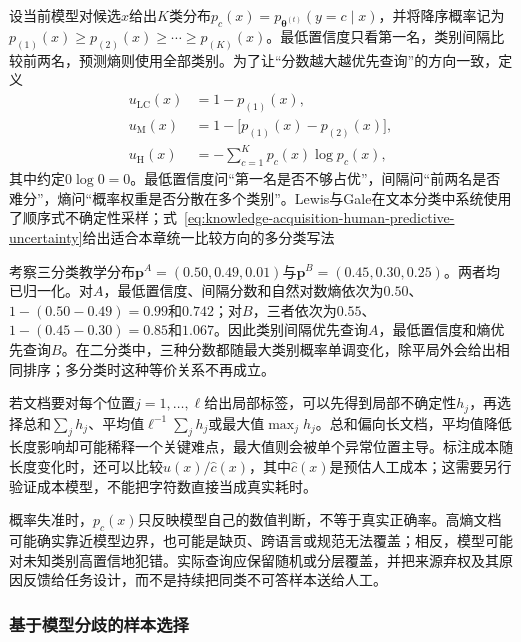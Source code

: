 设当前模型对候选$x$给出$K$类分布$p_c(x)=p_{\bm{\theta}^{(t)}}(y=c\mid x)$，并将降序概率记为$p_{(1)}(x)\geq p_{(2)}(x)\geq\cdots\geq p_{(K)}(x)$。最低置信度只看第一名，类别间隔比较前两名，预测熵则使用全部类别。为了让“分数越大越优先查询”的方向一致，定义
\begin{equation}
  \begin{aligned}
    u_{\mathrm{LC}}(x)
      &=1-p_{(1)}(x),\\
    u_{\mathrm{M}}(x)
      &=1-\bigl[p_{(1)}(x)-p_{(2)}(x)\bigr],\\
    u_{\mathrm{H}}(x)
      &=-\sum_{c=1}^{K}p_c(x)\log p_c(x),
  \end{aligned}
  \label{eq:knowledge-acquisition-human-predictive-uncertainty}
\end{equation}
其中约定$0\log0=0$。最低置信度问“第一名是否不够占优”，间隔问“前两名是否难分”，熵问“概率权重是否分散在多个类别”。Lewis与Gale在文本分类中系统使用了顺序式不确定性采样；式~\eqref{eq:knowledge-acquisition-human-predictive-uncertainty}给出适合本章统一比较方向的多分类写法

\begin{example}[三种不确定性分数可能给出不同排序]
  \label{ex:knowledge-acquisition-human-uncertainty-scores}
  考察三分类教学分布$\bm{p}^{A}=(0.50,0.49,0.01)$与$\bm{p}^{B}=(0.45,0.30,0.25)$。两者均已归一化。对$A$，最低置信度、间隔分数和自然对数熵依次为$0.50$、$1-(0.50-0.49)=0.99$和$0.742$；对$B$，三者依次为$0.55$、$1-(0.45-0.30)=0.85$和$1.067$。因此类别间隔优先查询$A$，最低置信度和熵优先查询$B$。在二分类中，三种分数都随最大类别概率单调变化，除平局外会给出相同排序；多分类时这种等价关系不再成立。
\end{example}

若文档要对每个位置$j=1,\ldots,\ell$给出局部标签，可以先得到局部不确定性$h_j$，再选择总和$\sum_jh_j$、平均值$\ell^{-1}\sum_jh_j$或最大值$\max_jh_j$。总和偏向长文档，平均值降低长度影响却可能稀释一个关键难点，最大值则会被单个异常位置主导。标注成本随长度变化时，还可以比较$u(x)/\widehat c(x)$，其中$\widehat c(x)$是预估人工成本；这需要另行验证成本模型，不能把字符数直接当成真实耗时。

概率失准时，$p_c(x)$只反映模型自己的数值判断，不等于真实正确率。高熵文档可能确实靠近模型边界，也可能是缺页、跨语言或规范无法覆盖；相反，模型可能对未知类别高置信地犯错。实际查询应保留随机或分层覆盖，并把来源弃权及其原因反馈给任务设计，而不是持续把同类不可答样本送给人工。

\subsubsection{基于模型分歧的样本选择}
\label{sec:knowledge-acquisition-human-model-disagreement}

